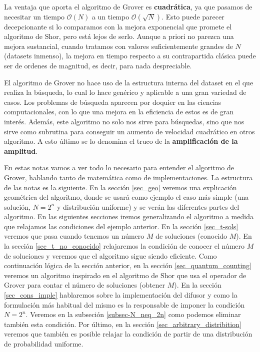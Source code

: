 \documentclass[a4paper,11pt]{article} %
\numberwithin{equation}{section}
\begin{document}
La ventaja que aporta el algoritmo de Grover es \textbf{cuadrática}, ya que pasamos de necesitar un tiempo $\mathcal{O}(N)$ a un tiempo $\mathcal{O}(\sqrt{N})$. Esto puede parecer decepcionante si lo comparamos con la mejora exponencial que promete el algoritmo de Shor, pero está lejos de serlo.  Aunque a priori no parezca una mejora sustancial, cuando tratamos con valores suficientemente grandes de $N$ (datasets inmenso), la mejora en tiempo respecto a su contrapartida clásica puede ser de ordenes de magnitud, es decir, para nada despreciable. 

El algoritmo de Grover no hace uso de la estructura interna del dataset en el que realiza la búsqueda, lo cual lo hace genérico y aplicable a una gran variedad de casos. Los problemas de búsqueda aparecen por doquier en las ciencias computacionales, con lo que una mejora en la eficiencia de estos es de gran interés. Además, este algoritmo no solo nos sirve para búsquedas, sino que nos sirve como subrutina para conseguir un aumento de velocidad cuadrático en otros algoritmo. A esto último se lo denomina el truco de la \textbf{amplificación de la amplitud}.

En estas notas vamos a ver todo lo necesario para entender el algoritmo de Grover, hablando tanto de matemática como de implementaciones. La estructura de las notas es la siguiente. En la sección \ref{sec_geo} veremos una explicación geométrica del algoritmo, donde se usará como ejemplo el caso más simple (una solución, $N=2^n$ y distribución uniforme) y se verán las diferentes partes del algoritmo. En las siguientes secciones iremos generalizando el algoritmo a medida que relajamos las condiciones del ejemplo anterior. En la sección \ref{sec_t-sols} veremos que pasa cuando tenemos un número $M$ de soluciones (conocido $M$). En la sección \ref{sec_t_no_conocido} relajaremos la condición de conocer el número $M$ de soluciones y veremos que el algoritmo sigue siendo eficiente. Como continuación lógica de la sección anterior, en la sección \ref{sec_quantum_counting} veremos un algoritmo inspirado en el algoritmo de Shor que usa el operador de Grover para contar el número de soluciones (obtener $M$). En la sección \ref{sec_cons_imple} hablaremos sobre la implementación del difusor y como la formulación más habitual del mismo es la responsable de imponer la condición $N=2^n$. Veremos en la subseción \ref{subsec-N_neq_2n} como podemos eliminar también esta condición. Por último, en la sección \ref{sec_arbitrary_distribition} veremos que también es posible relajar la condición de partir de una distribución de probabilidad uniforme. 
\end{document}
